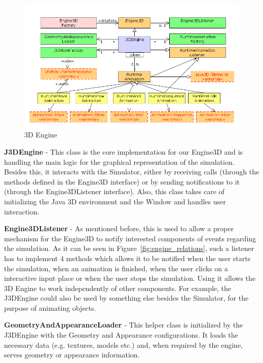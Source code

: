 \begin{figure}[ht]
   \begin{center}
       \includegraphics[scale=0.50]{image/engine_structure.png}
       \caption{3D Engine}
       \label{fig:engine_structure}
       \end{center}
   \end{figure}
   
\textbf{J3DEngine} - This class is the core implementation for our Engine3D and is handling the main
logic for the graphical representation of the simulation. Besides this, it interacts with the
Simulator, either by receiving calls (through the methods defined in the Engine3D interface) or by
sending notifications to it (through the Engine3DListener interface). Also, this class takes care of
initializing the Java 3D environment and the Window and handles user interaction.

\textbf{Engine3DListener} - As mentioned before, this is used to allow a proper mechanism for the
Engine3D to notify interested components of events regarding the simulation. As it can be seen in
Figure~\ref{fig:engine_relations}, such a listener has to implement 4 methods which allows it to be
notified when the user starts the simulation, when an animation is finished, when the user clicks on
a interactive input place or when the user stops the simulation. Using it allows the 3D Engine to
work independently of other components. For example, the J3DEngine could also be used by something
else besides the Simulator, for the purpose of animating objects.

\textbf{GeometryAndAppearanceLoader} - This helper class is initialized by the J3DEngine with the
Geometry and Appearance configurations. It loads the necessary data (e.g. textures, models etc.)
and, when required by the engine, serves geometry or appearance information.

